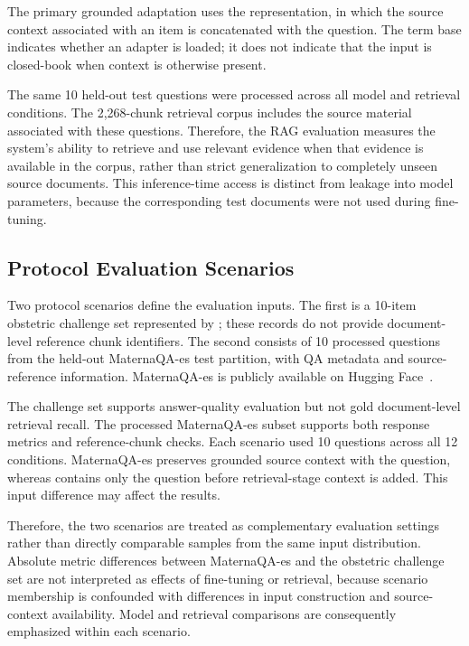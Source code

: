The primary grounded adaptation uses the 
representation, in which the source context associated with an item is
concatenated with the question. The term base indicates whether an adapter is
loaded; it does not indicate that the input is closed-book when context is
otherwise present.

The same 10 held-out test questions were processed across all model and
retrieval conditions. The 2,268-chunk retrieval corpus includes the source
material associated with these questions. Therefore, the RAG evaluation
measures the system's ability to retrieve and use relevant evidence when
that evidence is available in the corpus, rather than strict generalization
to completely unseen source documents. This inference-time access is
distinct from leakage into model parameters, because the corresponding test
documents were not used during fine-tuning.

\subsection{Protocol Evaluation Scenarios}
Two protocol scenarios define the evaluation inputs. The first is a
10-item obstetric challenge set represented by ;
these records do not provide document-level reference chunk identifiers.
The second consists of 10 processed questions from the held-out MaternaQA-es
test partition, with QA metadata and source-reference information.
MaternaQA-es is publicly available on Hugging Face~\cite{maternaqa2026}.

The challenge set supports answer-quality evaluation but not gold
document-level retrieval recall. The processed MaternaQA-es subset supports
both response metrics and reference-chunk checks. Each scenario used 10
questions across all 12 conditions. MaternaQA-es preserves grounded source
context with the question, whereas  contains only the
question before retrieval-stage context is added. This input difference may
affect the results.

Therefore, the two scenarios are treated as complementary evaluation
settings rather than directly comparable samples from the same input
distribution. Absolute metric differences between MaternaQA-es and the
obstetric challenge set are not interpreted as effects of fine-tuning or
retrieval, because scenario membership is confounded with differences in
input construction and source-context availability. Model and retrieval
comparisons are consequently emphasized within each scenario.

